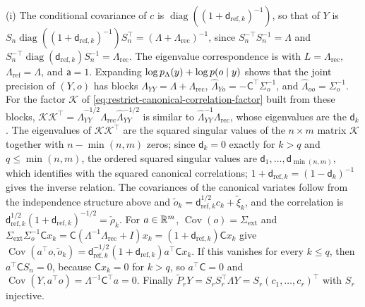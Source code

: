 (i) The conditional covariance of \(c\) is
\(\operatorname{diag}((1+\mathsf d_{\mathrm{ref},k})^{-1})\), so that of \(Y\) is
\(S_n\operatorname{diag}((1+\mathsf d_{\mathrm{ref},k})^{-1})S_n^\top=(\Lambda+\Lambda_{\mathrm{rec}})^{-1}\),
since \(S_n^{-\top}S_n^{-1}=\Lambda\) and
\(S_n^{-\top}\operatorname{diag}(\mathsf d_{\mathrm{ref},k})S_n^{-1}=\Lambda_{\mathrm{rec}}\).
The eigenvalue correspondence is  with
\(L=\Lambda_{\mathrm{rec}}\), \(\Lambda_{\mathrm{ref}}=\Lambda\), and \(\mathsf a=1\).
Expanding \(\log p_\Lambda(y)+\log p(o\mid y)\) shows that the joint precision of
\((Y,o)\) has blocks \(\widehat\Lambda_{YY}=\Lambda+\Lambda_{\mathrm{rec}}\),
\(\widehat\Lambda_{Yo}=-\mathsf C^\top\Sigma_o^{-1}\), and
\(\widehat\Lambda_{oo}=\Sigma_o^{-1}\). For the factor \(\mathcal K\) of
\eqref{eq:restrict-canonical-correlation-factor} built from these blocks,
\(\mathcal K\mathcal K^\top=\widehat\Lambda_{YY}^{-1/2}\Lambda_{\mathrm{rec}}\widehat\Lambda_{YY}^{-1/2}\)
is similar to \(\widehat\Lambda_{YY}^{-1}\Lambda_{\mathrm{rec}}\), whose eigenvalues
are the \(\mathsf d_k\). The eigenvalues of \(\mathcal K\mathcal K^\top\) are the
squared singular values of the \(n\times m\) matrix \(\mathcal K\) together with
\(n-\min(n,m)\) zeros; since \(\mathsf d_k=0\) exactly for \(k>q\) and
\(q\leq\min(n,m)\), the ordered squared singular values are
\(\mathsf d_1,\ldots,\mathsf d_{\min(n,m)}\), which 
identifies with the squared canonical correlations; \(1+\mathsf d_{\mathrm{ref},k}=(1-\mathsf d_k)^{-1}\)
gives the inverse relation. The covariances of the canonical variates follow
from the independence structure above and \(\tilde o_k=\mathsf d_{\mathrm{ref},k}^{1/2}c_k+\tilde\xi_k\),
and the correlation is
\(\mathsf d_{\mathrm{ref},k}^{1/2}(1+\mathsf d_{\mathrm{ref},k})^{-1/2}=\check\rho_k\).
For \(a\in\mathbb R^m\), \(\operatorname{Cov}(o)=\Sigma_{\mathrm{ext}}\) and
\(\Sigma_{\mathrm{ext}}\Sigma_o^{-1}\mathsf Cx_k=\mathsf C(\Lambda^{-1}\Lambda_{\mathrm{rec}}+I)x_k=(1+\mathsf d_{\mathrm{ref},k})\mathsf Cx_k\)
give
\(\operatorname{Cov}(a^\top o,\tilde o_k)=\mathsf d_{\mathrm{ref},k}^{-1/2}(1+\mathsf d_{\mathrm{ref},k})a^\top\mathsf Cx_k\).
If this vanishes for every \(k\leq q\), then \(a^\top\mathsf CS_n=0\), because
\(\mathsf Cx_k=0\) for \(k>q\), so \(a^\top\mathsf C=0\) and
\(\operatorname{Cov}(Y,a^\top o)=\Lambda^{-1}\mathsf C^\top a=0\). Finally
\(\widetilde P_rY=S_rS_r^\top\Lambda Y=S_r(c_1,\ldots,c_r)^\top\) with \(S_r\) injective.

